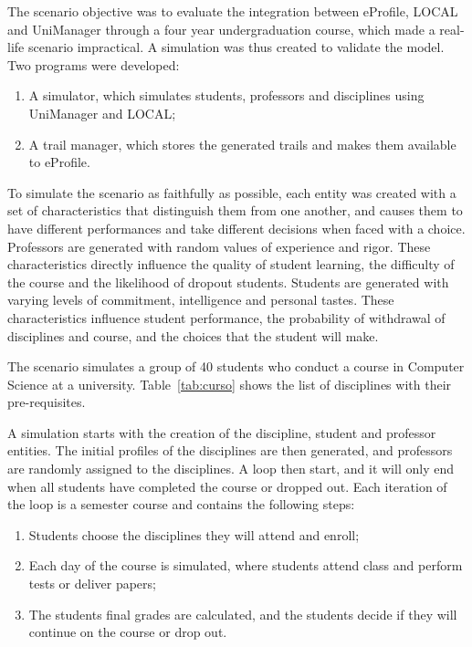 \documentclass{svjour3}                     %
\begin{document}
The scenario objective was to evaluate the integration between eProfile, LOCAL and UniManager through a four year undergraduation course, which made a real-life scenario impractical. A simulation was thus created to validate the model. Two programs were developed:

\begin{enumerate}
  \item A simulator, which simulates students, professors and disciplines using UniManager and LOCAL;
  \item A trail manager, which stores the generated trails and makes them available to eProfile.
\end{enumerate}

To simulate the scenario as faithfully as possible, each entity was created with a set of characteristics that distinguish them from one another, and causes them to have different performances and take different decisions when faced with a choice. Professors are generated with random values of experience and rigor. These characteristics directly influence the quality of student learning, the difficulty of the course and the likelihood of dropout students. Students are generated with varying levels of commitment, intelligence and personal tastes. These characteristics influence student performance, the probability of withdrawal of disciplines and course, and the choices that the student will make.

The scenario simulates a group of 40 students who conduct a course in Computer Science at a university. Table~\ref{tab:curso} shows the list of disciplines with their pre-requisites.

A simulation starts with the creation of the discipline, student and professor entities. The initial profiles of the disciplines are then generated, and professors are randomly assigned to the disciplines. A loop then start, and it will only end when all students have completed the course or dropped out. Each iteration of the loop is a semester course and contains the following steps:

\begin{enumerate}
\item Students choose the disciplines they will attend and enroll;
\item Each day of the course is simulated, where students attend class and perform tests or deliver papers;
\item The students final grades are calculated, and the students decide if they will continue on the course or drop out.
\end{enumerate}
\end{document}
